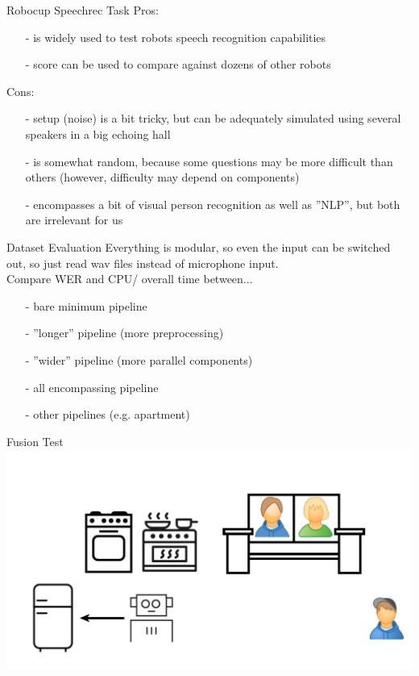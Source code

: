 \documentclass{beamer}
\begin{document}
	\begin{frame}{Robocup Speechrec Task}
		\pause
		Pros:
		\begin{itemize}
			\item[-] is widely used to test robots speech recognition capabilities
			\item[-] score can be used to compare against dozens of other robots
		\end{itemize}
		\pause
		Cons:
		\begin{itemize}
			\item[-] setup (noise) is a bit tricky, but can be adequately simulated using several speakers in a big echoing hall
			\item[-] is somewhat random, because some questions may be more difficult than others (however, difficulty may depend on components)
			\item[-] encompasses a bit of visual person recognition as well as ''NLP'', but both are irrelevant for us
		\end{itemize}
	\end{frame}
	
	\begin{frame}{Dataset Evaluation}
		Everything is modular, so even the input can be switched out, so just read wav files instead of microphone input.\\

		Compare WER and CPU/ overall time between...
		\begin{itemize}
			\item[-] bare minimum pipeline
			\item[-] ''longer'' pipeline (more preprocessing)
			\item[-] ''wider'' pipeline (more parallel components)
			\item[-] all encompassing pipeline
			\item[-] other pipelines (e.g. apartment)
		\end{itemize}
	\end{frame}
	
	\begin{frame}{Fusion Test}
		\centering
		\includegraphics[width=.75\textwidth]{Bilder/fusion_test_0}
	\end{frame}
	
\end{document}
